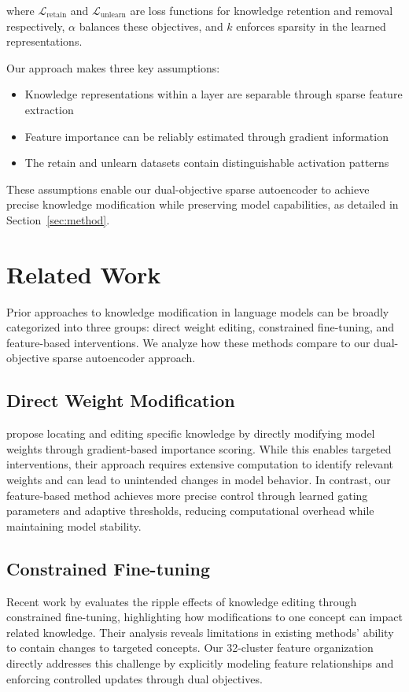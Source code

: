 \documentclass{article} %
\begin{document}
where $\mathcal{L}_{\text{retain}}$ and $\mathcal{L}_{\text{unlearn}}$ are loss functions for knowledge retention and removal respectively, $\alpha$ balances these objectives, and $k$ enforces sparsity in the learned representations.

Our approach makes three key assumptions:
\begin{itemize}
    \item Knowledge representations within a layer are separable through sparse feature extraction
    \item Feature importance can be reliably estimated through gradient information
    \item The retain and unlearn datasets contain distinguishable activation patterns
\end{itemize}

These assumptions enable our dual-objective sparse autoencoder to achieve precise knowledge modification while preserving model capabilities, as detailed in Section~\ref{sec:method}.

\section{Related Work}
\label{sec:related}

Prior approaches to knowledge modification in language models can be broadly categorized into three groups: direct weight editing, constrained fine-tuning, and feature-based interventions. We analyze how these methods compare to our dual-objective sparse autoencoder approach.

\subsection{Direct Weight Modification}
\cite{Meng2022LocatingAE} propose locating and editing specific knowledge by directly modifying model weights through gradient-based importance scoring. While this enables targeted interventions, their approach requires extensive computation to identify relevant weights and can lead to unintended changes in model behavior. In contrast, our feature-based method achieves more precise control through learned gating parameters and adaptive thresholds, reducing computational overhead while maintaining model stability.

\subsection{Constrained Fine-tuning}
Recent work by \cite{Cohen2023EvaluatingTR} evaluates the ripple effects of knowledge editing through constrained fine-tuning, highlighting how modifications to one concept can impact related knowledge. Their analysis reveals limitations in existing methods' ability to contain changes to targeted concepts. Our 32-cluster feature organization directly addresses this challenge by explicitly modeling feature relationships and enforcing controlled updates through dual objectives.
\end{document}
